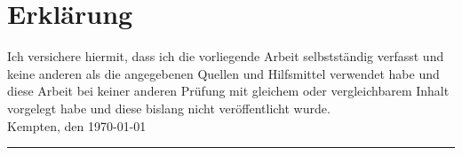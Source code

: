 %
%
%

\chapter*{Erklärung} %

Ich versichere hiermit, dass ich die vorliegende Arbeit selbstständig verfasst und keine anderen als die angegebenen Quellen und Hilfsmittel verwendet habe und diese Arbeit bei keiner anderen Prüfung mit gleichem oder vergleichbarem Inhalt vorgelegt habe und diese bislang nicht veröffentlicht wurde. %
\\[2ex]

Kempten, den \today

\rule[-0.2cm]{5cm}{0.5pt}

\vspace*{-2ex}
\autor \\[10ex]

\rmfamily

\thispagestyle{empty}

